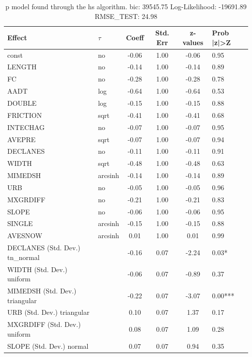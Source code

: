 \begin{table}
	\caption{p model found through the hs algorithm. bic: 39545.75 Log-Likelihood: -19691.89 RMSE_TEST: 24.98}
	\begin{center}
		\begin{tabular}{|l|l|c|c|c|l|}
			\hline
			Effect & $\tau$ & Coeff & Std. Err & z-values & Prob |z|>Z \\
			\hline
			const & no & -0.06 & 1.00 & -0.06 & 0.95 \\
			\hline
			LENGTH & no & -0.14 & 1.00 & -0.14 & 0.89 \\
			\hline
			FC & no & -0.28 & 1.00 & -0.28 & 0.78 \\
			\hline
			AADT & log & -0.64 & 1.00 & -0.64 & 0.53 \\
			\hline
			DOUBLE & log & -0.15 & 1.00 & -0.15 & 0.88 \\
			\hline
			FRICTION & sqrt & -0.41 & 1.00 & -0.41 & 0.68 \\
			\hline
			INTECHAG & no & -0.07 & 1.00 & -0.07 & 0.95 \\
			\hline
			AVEPRE & sqrt & -0.07 & 1.00 & -0.07 & 0.94 \\
			\hline
			DECLANES & no & -0.11 & 1.00 & -0.11 & 0.91 \\
			\hline
			WIDTH & sqrt & -0.48 & 1.00 & -0.48 & 0.63 \\
			\hline
			MIMEDSH & arcsinh & -0.14 & 1.00 & -0.14 & 0.89 \\
			\hline
			URB & no & -0.05 & 1.00 & -0.05 & 0.96 \\
			\hline
			MXGRDIFF & no & -0.21 & 1.00 & -0.21 & 0.83 \\
			\hline
			SLOPE & no & -0.06 & 1.00 & -0.06 & 0.95 \\
			\hline
			SINGLE & arcsinh & -0.15 & 1.00 & -0.15 & 0.88 \\
			\hline
			AVESNOW & arcsinh & 0.01 & 1.00 & 0.01 & 0.99 \\
			\hline
			DECLANES (Std. Dev.) tn_normal &  & -0.16 & 0.07 & -2.24 & 0.03* \\
			\hline
			WIDTH (Std. Dev.) uniform &  & -0.06 & 0.07 & -0.89 & 0.37 \\
			\hline
			MIMEDSH (Std. Dev.) triangular &  & -0.22 & 0.07 & -3.07 & 0.00*** \\
			\hline
			URB (Std. Dev.) triangular &  & 0.10 & 0.07 & 1.37 & 0.17 \\
			\hline
			MXGRDIFF (Std. Dev.) uniform &  & 0.08 & 0.07 & 1.09 & 0.28 \\
			\hline
			SLOPE (Std. Dev.) normal &  & 0.07 & 0.07 & 0.94 & 0.35 \\

\end{tabular}
\end{center}
\end{table}
